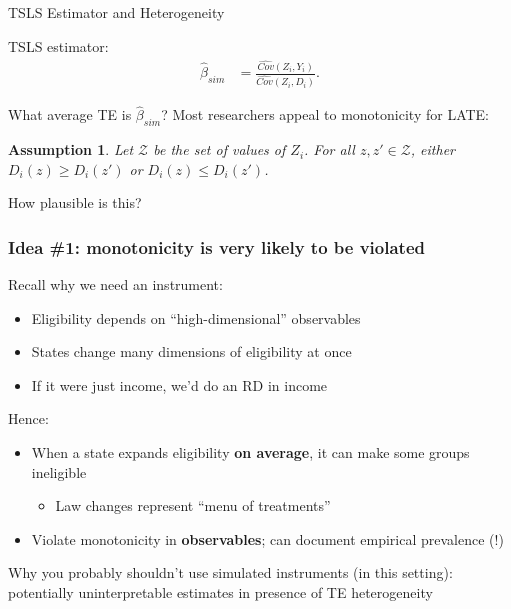 \documentclass[notes,11pt, aspectratio=169]{beamer}
\newtheorem{assN}{Assumption}
\newenvironment{wideitemize}{\itemize\addtolength{\itemsep}{10pt}}{\enditemize}
\begin{document}
\begin{frame}{TSLS Estimator and Heterogeneity}
  \begin{wideitemize}
  \item  TSLS estimator:
  \begin{align*}
    \hat{\beta}_{sim} &= \frac{\widehat{Cov}(Z_{i}, Y_{i})}{\widehat{Cov}(Z_{i}, D_{i})}.
  \end{align*}
\item What average TE is $\hat{\beta}_{sim}$? Most researchers appeal
  to monotonicity for LATE:
  \begin{assN}
    Let $\mathcal{Z}$ be the set of values of $Z_{i}$. For all
    $z, z' \in \mathcal{Z}$, either $D_{i}(z) \geq D_{i}(z')$ or
    $D_{i}(z) \leq D_{i}(z')$.
  \end{assN}
\item How plausible is this?
  \end{wideitemize}
\end{frame}


\begin{frame}
\frametitle{Idea \#1: monotonicity is very likely to be violated}

Recall why we need an instrument: 
\begin{itemize}
\item Eligibility depends on ``high-dimensional'' observables
\item States change many dimensions of eligibility at once 
\item If it were just income, we'd do an RD in income 
\end{itemize}

Hence:
\begin{itemize}
	\item When a state expands eligibility \textbf{on average}, it can make some groups ineligible 
		\begin{itemize}
	\item Law changes represent ``menu of treatments'' 
		\end{itemize}
	\item Violate monotonicity in \textbf{observables}; can document empirical prevalence (!)
	\end{itemize}


Why you probably shouldn't use simulated instruments (in this setting): potentially uninterpretable estimates in presence of TE heterogeneity
\end{frame}
\end{document}
